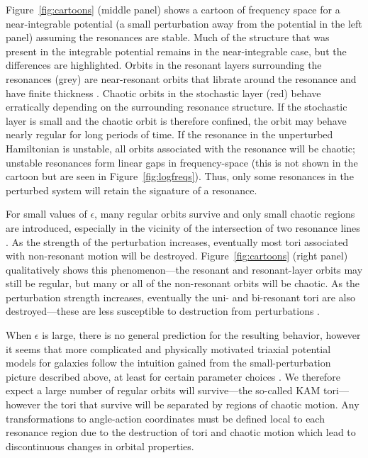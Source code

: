 \documentclass[letterpaper,12pt,preprint]{aastex}
\newcommand{\chchchanges}[1]{{\color{red} {#1}}}
\begin{document}
Figure~\ref{fig:cartoons} (middle panel) shows a cartoon of frequency space for a near-integrable potential (a small perturbation away from the potential in the left panel) assuming the resonances are stable. Much of the structure that was present in the integrable potential remains in the near-integrable case, but the differences are highlighted. Orbits in the resonant layers surrounding the resonances (grey) are near-resonant orbits that librate around the resonance \chchchanges{and have finite thickness \citep[e.g.,][]{merritt99}}. Chaotic orbits in the stochastic layer (red) behave erratically depending on the surrounding resonance structure. If the stochastic layer is small and the chaotic orbit is therefore confined, the orbit may behave nearly regular for long periods of time. \chchchanges{If the resonance in the unperturbed Hamiltonian is unstable, all orbits associated with the resonance will be chaotic; unstable resonances form linear gaps in frequency-space (this is not shown in the cartoon but are seen in Figure~\ref{fig:logfreqs}). Thus, only some resonances in the perturbed system will retain the signature of a resonance.}

For small values of $\epsilon$, many regular orbits survive and only small chaotic regions are introduced, \chchchanges{especially in the vicinity of the intersection of two resonance lines \citep[commonly referred to as `resonance overlap'; see][]{chirikov60}}. As the strength of the perturbation increases, eventually most tori associated with \chchchanges{non-resonant} motion will be destroyed. Figure~\ref{fig:cartoons} (right panel) qualitatively shows this phenomenon---the resonant and resonant-layer orbits may still be regular, but many or all of the \chchchanges{non-resonant} orbits will be chaotic. As the perturbation strength increases, eventually the uni- and bi-resonant tori are also destroyed---these are less susceptible to destruction from perturbations \cite[for a more quantitative illustration of this transition from integrability to global chaos, see Figure~9 in][]{valluri98}.

When $\epsilon$ is large, there is no general prediction for the resulting behavior, however it seems that more complicated and physically motivated triaxial potential models for galaxies follow the intuition gained from the small-perturbation picture described above, at least for certain parameter choices \citep[e.g.,][]{valluri98, merritt99}. We therefore expect a large number of regular orbits will survive---the so-called KAM tori---however the tori that survive will be separated by regions of chaotic motion. Any transformations to angle-action coordinates must be defined local to each resonance region due to the destruction of tori and chaotic motion which lead to discontinuous changes in orbital properties.
\end{document}

